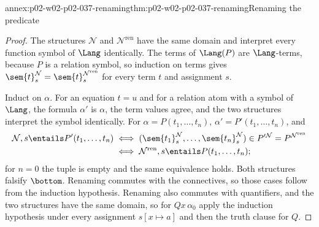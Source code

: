 \begin{annexitem}{annex:p02-w02-p02-037-renaming}{thm:p02-w02-p02-037-renaming}{Renaming the predicate}
\begin{proof}
The structures \(\mathcal N\) and \(\mathcal N^{\mathrm{ren}}\) have the same domain
and interpret every function symbol of \(\Lang\) identically.  The terms of
\(\Lang(P)\) are \(\Lang\)-terms, because \(P\) is a relation symbol, so
induction on terms gives
\(\sem{t}^{\mathcal N}_s=\sem{t}^{\mathcal N^{\mathrm{ren}}}_s\) for every term
\(t\) and assignment \(s\).

Induct on \(\alpha\).  For an equation \(t=u\) and for a relation atom with
a symbol of \(\Lang\), the formula \(\alpha'\) is \(\alpha\), the term values
agree, and the two structures interpret the symbol identically.  For
\(\alpha=P(t_1,\ldots,t_n)\), \(\alpha'=P'(t_1,\ldots,t_n)\), and
\[
\begin{aligned}
 \mathcal N,s\entails P'(t_1,\ldots,t_n)
 &\iff
 (\sem{t_1}^{\mathcal N}_s,\ldots,\sem{t_n}^{\mathcal N}_s)\in P'^{\mathcal N}
 =P^{\mathcal N^{\mathrm{ren}}}\\
 &\iff
 \mathcal N^{\mathrm{ren}},s\entails P(t_1,\ldots,t_n);
\end{aligned}
\]
for \(n=0\) the tuple is empty and the same equivalence holds.  Both
structures falsify \(\bottom\).  Renaming commutes with the connectives, so
those cases follow from the induction hypothesis.  Renaming also commutes
with quantifiers, and the two structures have the same domain, so for
\(Qx\,\alpha_0\) apply the induction hypothesis under every assignment
\(s[x\mapsto a]\) and then the truth clause for \(Q\).
\end{proof}
\end{annexitem}

